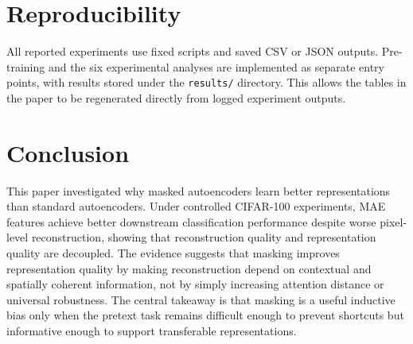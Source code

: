 \documentclass[10pt,twocolumn,letterpaper]{article}
\begin{document}
\section{Reproducibility}

All reported experiments use fixed scripts and saved CSV or JSON outputs. Pre-training and the six experimental analyses are implemented as separate entry points, with results stored under the \texttt{results/} directory. This allows the tables in the paper to be regenerated directly from logged experiment outputs.

\section{Conclusion}

This paper investigated why masked autoencoders learn better representations than standard autoencoders. Under controlled CIFAR-100 experiments, MAE features achieve better downstream classification performance despite worse pixel-level reconstruction, showing that reconstruction quality and representation quality are decoupled. The evidence suggests that masking improves representation quality by making reconstruction depend on contextual and spatially coherent information, not by simply increasing attention distance or universal robustness. The central takeaway is that masking is a useful inductive bias only when the pretext task remains difficult enough to prevent shortcuts but informative enough to support transferable representations.
\end{document}
